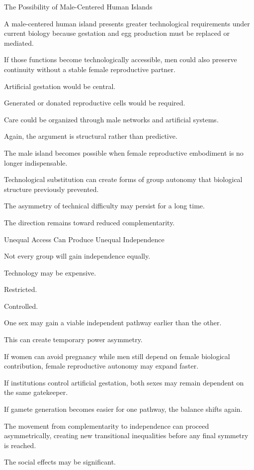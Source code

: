 The Possibility of Male-Centered Human Islands

A male-centered human island presents greater technological requirements under current biology because gestation and egg production must be replaced or mediated.

If those functions become technologically accessible, men could also preserve continuity without a stable female reproductive partner.

Artificial gestation would be central.

Generated or donated reproductive cells would be required.

Care could be organized through male networks and artificial systems.

Again, the argument is structural rather than predictive.

The male island becomes possible when female reproductive embodiment is no longer indispensable.

Technological substitution can create forms of group autonomy that biological structure previously prevented.

The asymmetry of technical difficulty may persist for a long time.

The direction remains toward reduced complementarity.

Unequal Access Can Produce Unequal Independence

Not every group will gain independence equally.

Technology may be expensive.

Restricted.

Controlled.

One sex may gain a viable independent pathway earlier than the other.

This can create temporary power asymmetry.

If women can avoid pregnancy while men still depend on female biological contribution, female reproductive autonomy may expand faster.

If institutions control artificial gestation, both sexes may remain dependent on the same gatekeeper.

If gamete generation becomes easier for one pathway, the balance shifts again.

The movement from complementarity to independence can proceed asymmetrically, creating new transitional inequalities before any final symmetry is reached.

The social effects may be significant.

